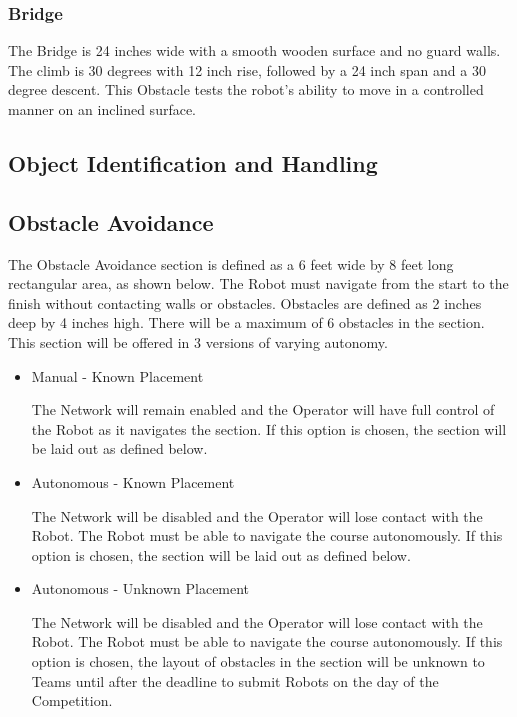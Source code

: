 \subsubsection{Bridge}
The Bridge is 24 inches wide with a smooth wooden surface and no guard walls. The climb is 30 degrees with 12 inch rise, followed by a 24 inch span and a 30 degree descent. This Obstacle tests the robot’s ability to move in a controlled manner on an inclined surface.

\subsection{Object Identification and Handling}


\subsection{Obstacle Avoidance}
The Obstacle Avoidance section is defined as a 6 feet wide by 8 feet long rectangular area, as shown below. The Robot must navigate from the start to the finish without contacting walls or obstacles. Obstacles are defined as 2 inches deep by 4 inches high. There will be a maximum of 6 obstacles in the section. This section will be offered in 3 versions of varying autonomy.

\begin{itemize}
    \item Manual - Known Placement
    
        The Network will remain enabled and the Operator will have full control of the Robot as it navigates the section. If this option is chosen, the section will be laid out as defined below.
    \item Autonomous - Known Placement
    
        The Network will be disabled and the Operator will lose contact with the Robot. The Robot must be able to navigate the course autonomously. If this option is chosen, the section will be laid out as defined below.
    \item Autonomous - Unknown Placement
    
        The Network will be disabled and the Operator will lose contact with the Robot. The Robot must be able to navigate the course autonomously. If this option is chosen, the layout of obstacles in the section will be unknown to Teams until after the deadline to submit Robots on the day of the Competition. 
        
\end{itemize}